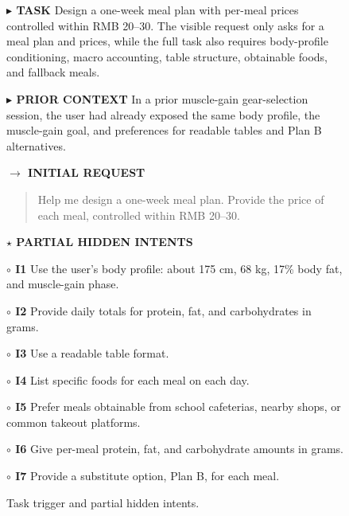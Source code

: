 \documentclass{llmxive}
\providecommand{\tcolorboxCase}[2]{\begin{tcolorbox}[
    title=#1,
    colback=casebg, 
    colframe=casetitlebg,
    rounded corners,
    sharp corners=northeast,
    sharp corners=southwest,
    width=1.00\linewidth,
    boxsep=2pt,
    top=2pt,
    bottom=2pt,
    enhanced,
    breakable,
    before=\setlength{\parindent}{0pt},
]

#2
\end{tcolorbox}
}
\providecommand{\caseZhangshunkaiOneTag}[3]{    {\setlength{\fboxsep}{1.6pt}\colorbox{#1}{\scriptsize\textbf{#3}}}}
\providecommand{\caseZhangshunkaiOneLine}[3]{    \caseZhangshunkaiOneTag{#1}{#2}{#3}\hspace{3pt}}
\begin{document}
\begin{figure}[!htbp]
    \centering
    \tcolorboxCase{Case Study -- Researcher -- DeepSeek V3.2: Task and Hidden Intents}{
    \small
    \caseZhangshunkaiOneLine{purple!70!black}{white}{$\blacktriangleright$ TASK}
    Design a one-week meal plan with per-meal prices controlled within RMB 20--30.
    The visible request only asks for a meal plan and prices, while the full task also requires body-profile conditioning, macro accounting, table structure, obtainable foods, and fallback meals.

    \vspace{3pt}
    \caseZhangshunkaiOneLine{purple!70!black}{white}{$\blacktriangleright$ PRIOR CONTEXT}
    In a prior muscle-gain gear-selection session, the user had already exposed the same body profile, the muscle-gain goal, and preferences for readable tables and Plan B alternatives.

    \vspace{3pt}
    \caseZhangshunkaiOneLine{blue!65!black}{white}{$\rightarrow$ INITIAL REQUEST}
    \begin{quote}
    \small
    
    Help me design a one-week meal plan. Provide the price of each meal, controlled within RMB 20--30.
    \end{quote}

    \vspace{2pt}
    \caseZhangshunkaiOneLine{orange!80!black}{white}{$\star$ PARTIAL HIDDEN INTENTS}
    \par
    \caseZhangshunkaiOneTag{red!12}{red!70!black}{$\circ$ I1} Use the user's body profile: about 175 cm, 68 kg, 17\% body fat, and muscle-gain phase.
    \par
    \caseZhangshunkaiOneTag{red!12}{red!70!black}{$\circ$ I2} Provide daily totals for protein, fat, and carbohydrates in grams.
    \par
    \caseZhangshunkaiOneTag{red!12}{red!70!black}{$\circ$ I3} Use a readable table format.
    \par
    \caseZhangshunkaiOneTag{red!12}{red!70!black}{$\circ$ I4} List specific foods for each meal on each day.
    \par
    \caseZhangshunkaiOneTag{red!12}{red!70!black}{$\circ$ I5} Prefer meals obtainable from school cafeterias, nearby shops, or common takeout platforms.
    \par
    \caseZhangshunkaiOneTag{red!12}{red!70!black}{$\circ$ I6} Give per-meal protein, fat, and carbohydrate amounts in grams.
    \par
    \caseZhangshunkaiOneTag{red!12}{red!70!black}{$\circ$ I7} Provide a substitute option, Plan B, for each meal.
    }
    \caption{Task trigger and partial hidden intents.}
    \label{fig:case_zhangshunkai_1_deepseek_task}
\end{figure}
\end{document}

